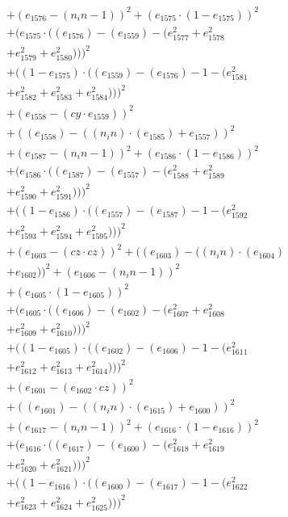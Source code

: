 \documentclass[10pt, a4paper]{article}
\begin{document}
\begin{align*}
& + (e_{1576} - (n_in - 1))^{2} + (e_{1575}  \cdot  (1 - e_{1575}))^{2} \\
& + (e_{1575}  \cdot  ((e_{1576}) - (e_{1559}) - (e_{1577}^{2} + e_{1578}^{2} \\
& + e_{1579}^{2} + e_{1580}^{2})))^{2} \\
& + ((1 - e_{1575})  \cdot  ((e_{1559}) - (e_{1576}) - 1 - (e_{1581}^{2} \\
& + e_{1582}^{2} + e_{1583}^{2} + e_{1584}^{2})))^{2} \\
& + (e_{1558} - (cy  \cdot  e_{1559}))^{2} \\
& + ((e_{1558}) - ((n_in)  \cdot  (e_{1585}) + e_{1557}))^{2} \\
& + (e_{1587} - (n_in - 1))^{2} + (e_{1586}  \cdot  (1 - e_{1586}))^{2} \\
& + (e_{1586}  \cdot  ((e_{1587}) - (e_{1557}) - (e_{1588}^{2} + e_{1589}^{2} \\
& + e_{1590}^{2} + e_{1591}^{2})))^{2} \\
& + ((1 - e_{1586})  \cdot  ((e_{1557}) - (e_{1587}) - 1 - (e_{1592}^{2} \\
& + e_{1593}^{2} + e_{1594}^{2} + e_{1595}^{2})))^{2} \\
& + (e_{1603} - (cz  \cdot  cz))^{2} + ((e_{1603}) - ((n_in)  \cdot  (e_{1604}) \\
& + e_{1602}))^{2} + (e_{1606} - (n_in - 1))^{2} \\
& + (e_{1605}  \cdot  (1 - e_{1605}))^{2} \\
& + (e_{1605}  \cdot  ((e_{1606}) - (e_{1602}) - (e_{1607}^{2} + e_{1608}^{2} \\
& + e_{1609}^{2} + e_{1610}^{2})))^{2} \\
& + ((1 - e_{1605})  \cdot  ((e_{1602}) - (e_{1606}) - 1 - (e_{1611}^{2} \\
& + e_{1612}^{2} + e_{1613}^{2} + e_{1614}^{2})))^{2} \\
& + (e_{1601} - (e_{1602}  \cdot  cz))^{2} \\
& + ((e_{1601}) - ((n_in)  \cdot  (e_{1615}) + e_{1600}))^{2} \\
& + (e_{1617} - (n_in - 1))^{2} + (e_{1616}  \cdot  (1 - e_{1616}))^{2} \\
& + (e_{1616}  \cdot  ((e_{1617}) - (e_{1600}) - (e_{1618}^{2} + e_{1619}^{2} \\
& + e_{1620}^{2} + e_{1621}^{2})))^{2} \\
& + ((1 - e_{1616})  \cdot  ((e_{1600}) - (e_{1617}) - 1 - (e_{1622}^{2} \\
& + e_{1623}^{2} + e_{1624}^{2} + e_{1625}^{2})))^{2} \\

\end{align*}
\end{document}
